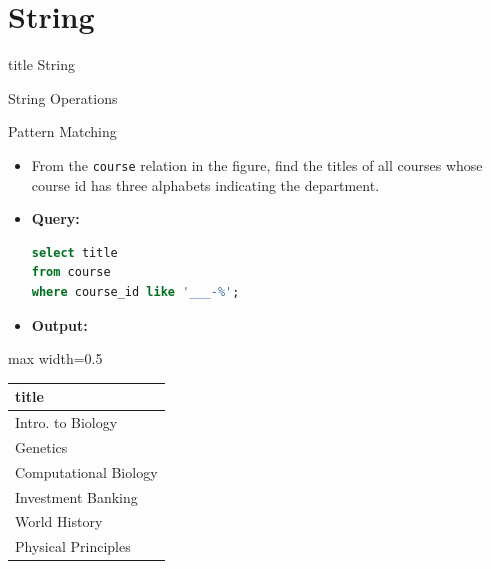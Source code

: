 \documentclass[aspectratio=169, xcolor=dvipsnames]{beamer}
\begin{document}
\section{String}
\begin{frame}
  \vfill
  \centering
  \begin{beamercolorbox}[sep=8pt,center,shadow=true,rounded=true]{title}
    String\par%
  \end{beamercolorbox}
  \vfill
\end{frame}

\begin{frame}[fragile]{String Operations}
    \begin{block}{Pattern Matching}
        \begin{itemize}[<+->]
            \item From the \texttt{course} relation in the figure, find the titles of all courses whose course id has three alphabets indicating the department.
            \item \textbf{Query:}
            \begin{lstlisting}[language=SQL]
select title 
from course 
where course_id like '___-%';
            \end{lstlisting}
            \item \textbf{Output:}
        \end{itemize}
    \end{block}
    \begin{center}
        \begin{adjustbox}{max width=0.5\textwidth}
        \begin{tabular}{|l|}
        \hline
        \textbf{title} \\ \hline
        Intro. to Biology \\ \hline
        Genetics \\ \hline
        Computational Biology \\ \hline
        Investment Banking \\ \hline
        World History \\ \hline
        Physical Principles \\ \hline
        \end{tabular}
        \end{adjustbox}
    \end{center}
    
\end{frame}
\end{document}
